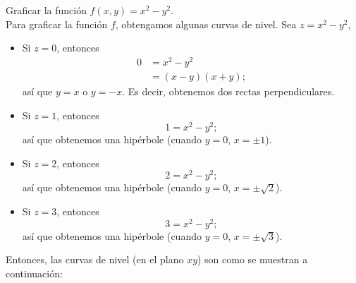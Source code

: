 \begin{example}
    Graficar la función $f(x, y) = x^{2} - y^{2}$.\\
    \solucion Para graficar la función $f$, obtengamos algunas curvas de nivel. Sea $z = x^2 - y^2$,
    \begin{itemize}
        \item Si $z = 0$, entonces
        \begin{align*}
            0 & = x^2 - y^2 \\
            & = (x-y)(x+y);
        \end{align*}
        así que $y = x$ o $y = -x$. Es decir, obtenemos dos rectas perpendiculares.
        \item Si $z = 1$, entonces
        $$1 = x^2 - y^2;$$
        así que obtenemos una hipérbole (cuando $y = 0$, $x = \pm 1$).
        \item Si $z = 2$, entonces
        $$2 = x^2 - y^2;$$
        así que obtenemos una hipérbole (cuando $y = 0$, $x = \pm \sqrt{2}$).
        \item Si $z = 3$, entonces
        $$3 = x^2 - y^2;$$
        así que obtenemos una hipérbole (cuando $y = 0$, $x = \pm \sqrt{3}$).
    \end{itemize}
    Entonces, las curvas de nivel (en el plano $xy$) son como se muestran a continuación:
    \begin{figure}[h!]
        \centering
         \hfill
         \\
\end{figure}
\end{example}
